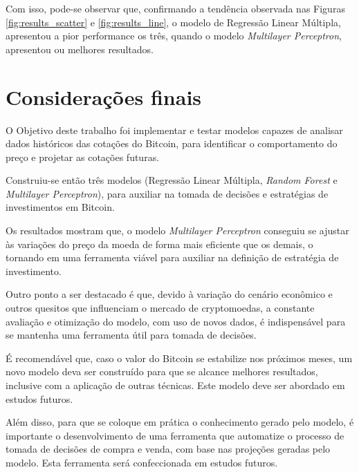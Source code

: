 \documentclass[12pt]{article}
\begin{document}
Com isso, pode-se observar que, confirmando a tendência observada nas Figuras 
\ref{fig:results_scatter} e \ref{fig:results_line}, o modelo de Regressão Linear
Múltipla, apresentou a pior performance os três, quando o modelo \textit{Multilayer
Perceptron}, apresentou ou melhores resultados.



\section{Considerações finais}

O Objetivo deste trabalho foi implementar e testar modelos capazes de analisar 
dados históricos das cotações do Bitcoin, para identificar o comportamento do 
preço e projetar as cotações futuras.

Construiu-se então três modelos (Regressão Linear Múltipla, \textit{Random Forest}
e \textit{Multilayer Perceptron}), para auxiliar na tomada de decisões e 
estratégias de investimentos em Bitcoin. 

Os resultados mostram que, o modelo \textit{Multilayer Perceptron} conseguiu se
ajustar às variações do preço da moeda de forma mais eficiente que os demais, 
o tornando em uma ferramenta viável para auxiliar na definição de estratégia de 
investimento.

Outro ponto a ser destacado é que, devido à variação do cenário econômico e outros
quesitos que influenciam o mercado de cryptomoedas, a constante avaliação e
otimização do modelo, com uso de novos dados, é indispensável para se mantenha
uma ferramenta útil para tomada de decisões.

É recomendável que, caso o valor do Bitcoin se estabilize nos próximos meses, um
novo modelo deva ser construído para que se alcance melhores resultados, inclusive
com a aplicação de outras técnicas. Este modelo deve ser abordado em estudos 
futuros.

Além disso, para que se coloque em prática o conhecimento gerado pelo modelo, é
importante o desenvolvimento de uma ferramenta que automatize o processo de 
tomada de decisões de compra e venda, com base nas projeções geradas pelo modelo.
Esta ferramenta será confeccionada em estudos futuros.

\clearpage



\end{document}
